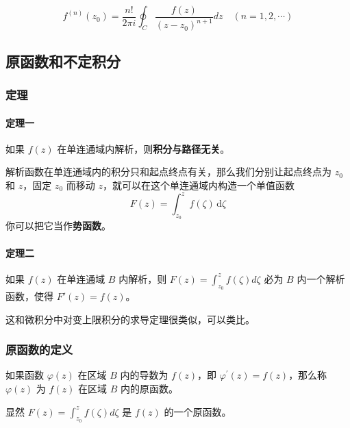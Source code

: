 \[
f^{(n)}(z_0) = \frac{n!}{2\pi i} \oint_{C} \frac{f(z)}{(z - z_0)^{n+1}}  dz \quad (n = 1, 2, \cdots)
\]
\subsection{原函数和不定积分}
\label{原函数和不定积分}
\subsubsection{定理}
\label{定理}
\paragraph{定理一}
\label{定理一}
如果 \(f(z)\) 在单连通域内解析，则\textbf{积分与路径无关}。

\begin{tcolorbox}[title={Note},colback=red!5!white
,colframe=red!75!black
,colbacktitle=yellow!50!red
,coltitle=red!25!black, fonttitle=\bfseries,subtitle style={boxrule=0.4pt, colback=yellow!50!red!25!white}]
解析函数在单连通域内的积分只和起点终点有关，那么我们分别让起点终点为
\(z_0\) 和 \(z\)，固定 \(z_0\) 而移动
\(z\)，就可以在这个单连通域内构造一个单值函数
\[F(z) = \int _{z_0}^z f(\zeta)\,\mathrm{d}\zeta\]
你可以把它当作\textbf{势函数}。

\end{tcolorbox}
\paragraph{定理二}
\label{定理二}
如果 \(f(z)\) 在单连通域 \(B\) 内解析，则
\(F(z)=\int_{z_0}^{z}f(\zeta)d\zeta\) 必为 \(B\) 内一个解析函数，使得
\(F'(z)=f(z)\)。

\begin{tcolorbox}[title={Note},colback=red!5!white
,colframe=red!75!black
,colbacktitle=yellow!50!red
,coltitle=red!25!black, fonttitle=\bfseries,subtitle style={boxrule=0.4pt, colback=yellow!50!red!25!white}]
这和微积分中对变上限积分的求导定理很类似，可以类比。

\end{tcolorbox}
\subsubsection{原函数的定义}
\label{原函数的定义}
如果函数 \(\varphi(z)\) 在区域 \(B\) 内的导数为 \(f(z)\)，即
\(\varphi^{\prime}(z)=f(z)\)，那么称 \(\varphi(z)\) 为 \(f(z)\) 在区域
\(B\) 内的原函数。

显然 \(F(z)=\int_{z_0}^{z}f(\zeta)d\zeta\) 是 \(f(z)\) 的一个原函数。

